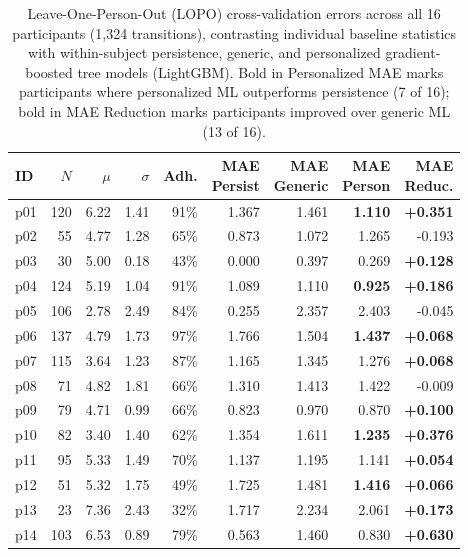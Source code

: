 \documentclass[runningheads]{llncs}
\begin{document}
\begin{table}[H]
\centering
\caption{Leave-One-Person-Out (LOPO) cross-validation errors across all 16 participants (1,324 transitions), contrasting individual baseline statistics with within-subject persistence, generic, and personalized gradient-boosted tree models (LightGBM). Bold in Personalized MAE marks participants where personalized ML outperforms persistence (7 of 16); bold in MAE Reduction marks participants improved over generic ML (13 of 16).}
\label{tab:lopo_full}
\begingroup\footnotesize\setlength{\tabcolsep}{2.8pt}\renewcommand{\arraystretch}{0.95}
\begin{tabular*}{\linewidth}{@{\extracolsep{\fill}}lrrrrrrrr}
\toprule
ID & $N$ & $\mu$ & $\sigma$ & Adh. & \shortstack{MAE\\Persist} & \shortstack{MAE\\Generic} & \shortstack{MAE\\Person} & \shortstack{MAE\\Reduc.}\\
\midrule
p01 & 120 & 6.22 & 1.41 & 91\% & 1.367 & 1.461 & \textbf{1.110} & \textbf{+0.351}\\
p02 & 55 & 4.77 & 1.28 & 65\% & 0.873 & 1.072 & 1.265 & -0.193\\
p03 & 30 & 5.00 & 0.18 & 43\% & 0.000 & 0.397 & 0.269 & \textbf{+0.128}\\
p04 & 124 & 5.19 & 1.04 & 91\% & 1.089 & 1.110 & \textbf{0.925} & \textbf{+0.186}\\
p05 & 106 & 2.78 & 2.49 & 84\% & 0.255 & 2.357 & 2.403 & -0.045\\
p06 & 137 & 4.79 & 1.73 & 97\% & 1.766 & 1.504 & \textbf{1.437} & \textbf{+0.068}\\
p07 & 115 & 3.64 & 1.23 & 87\% & 1.165 & 1.345 & 1.276 & \textbf{+0.068}\\
p08 & 71 & 4.82 & 1.81 & 66\% & 1.310 & 1.413 & 1.422 & -0.009\\
p09 & 79 & 4.71 & 0.99 & 66\% & 0.823 & 0.970 & 0.870 & \textbf{+0.100}\\
p10 & 82 & 3.40 & 1.40 & 62\% & 1.354 & 1.611 & \textbf{1.235} & \textbf{+0.376}\\
p11 & 95 & 5.33 & 1.49 & 70\% & 1.137 & 1.195 & 1.141 & \textbf{+0.054}\\
p12 & 51 & 5.32 & 1.75 & 49\% & 1.725 & 1.481 & \textbf{1.416} & \textbf{+0.066}\\
p13 & 23 & 7.36 & 2.43 & 32\% & 1.717 & 2.234 & 2.061 & \textbf{+0.173}\\
p14 & 103 & 6.53 & 0.89 & 79\% & 0.563 & 1.460 & 0.830 & \textbf{+0.630}\\

\end{tabular*}
\end{table}
\end{document}
